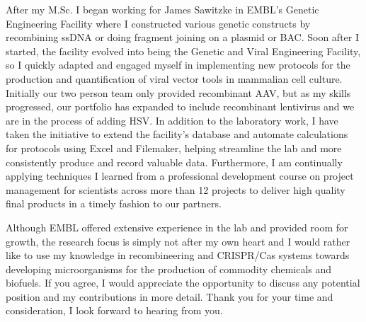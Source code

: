 \documentclass[11pt,a4paper,sans]{moderncv}
\begin{document}
\begin{spacing}{1.1}
After my M.Sc. I began working for James Sawitzke in EMBL's Genetic Engineering Facility where I constructed various genetic constructs by recombining ssDNA or doing fragment joining on a plasmid or BAC.
Soon after I started, the facility evolved into being the Genetic and Viral Engineering Facility, so I quickly adapted and engaged myself in implementing new protocols for the production and quantification of viral vector tools in mammalian cell culture. 			
Initially our two person team only provided recombinant AAV, but as my skills progressed, our portfolio has expanded to include recombinant lentivirus and we are in the process of adding HSV.
In addition to the laboratory work, I have taken the initiative to extend the facility's database and automate calculations for protocols using Excel and Filemaker, helping streamline the lab and more consistently produce and record valuable data. 
Furthermore, I am continually applying techniques I learned from a professional development course on project management for scientists across more than 12 projects to deliver high quality final products in a timely fashion to our partners.\par\vspace*{3mm}

Although EMBL offered extensive experience in the lab and provided room for growth, the research focus is simply not after my own heart and I would rather like to use my knowledge in recombineering and CRISPR/Cas systems towards developing microorganisms for the production of commodity chemicals and biofuels.
If you agree, I would appreciate the opportunity to discuss any potential position and my contributions in more detail. 
Thank you for your time and consideration, I look forward to hearing from you.
 

 

\end{spacing}
\makeletterclosing
\end{document}
